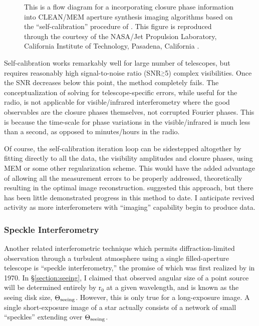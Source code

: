 \documentclass[12pt]{article}
\newcommand{\simge}{\mbox{$\stackrel{>}{_{\sim}}$}}
\begin{document}
\begin{figure}
\begin{center}
\caption{This is a flow diagram for a incorporating closure phase
information into CLEAN/MEM aperture synthesis imaging algorithms
based on the ``self-calibration'' procedure of \cite{cw81}. 
This figure is reproduced through the courtesy
of the NASA/Jet Propulsion Laboratory,
California Institute of Technology, Pasadena, California \citep{monnier_mss}.
\label{monnier_selfcal}}
\end{center}
\end{figure}

Self-calibration works remarkably well for large number of telescopes,
but requires reasonably high signal-to-noise ratio (SNR$\simge$5)
complex visibilities.  Once the SNR decreases below this point, the
method completely fails.  The conceptualization of solving for
telescope-specific errors, while useful for the
radio, is not applicable for visible/infrared interferometry where the good
observables are the closure phases themselves, not corrupted Fourier
phases.  This is because the time-scale for phase variations in the
visible/infrared is much less than a second, as opposed to
minutes/hours in the radio.

Of course, the self-calibration iteration loop can be sidestepped
altogether by fitting directly to all the data, the visibility
amplitudes and closure phases, using MEM or some other regularization
scheme.  This would have the added advantage of allowing all the
measurement errors to be properly addressed, theoretically resulting
in the optimal image reconstruction.  \citet{buscher1994} suggested
this approach, but there has been little demonstrated progress in this
method to date.  I anticipate revived activity as more
interferometers with ``imaging'' capability begin to produce data.


\subsubsection{Speckle Interferometry}
\label{section:speckle}

Another related interferometric technique which permits
diffraction-limited observation through a turbulent atmosphere using a
single filled-aperture telescope is ``speckle interferometry,'' the
promise of which was first realized by \citet{labeyrie70} in 1970.  In
\S\ref{section:seeing}, I claimed that observed angular size of a
point source will be determined entirely by r$_0$ at a given
wavelength, and is known as the seeing disk size, $\Theta_{\rm
  seeing}$.  However, this is only true for a long-exposure image.  A
single short-exposure image of a star actually consists of a network of
small ``speckles'' extending over $\Theta_{\rm seeing}$.
\end{document}
